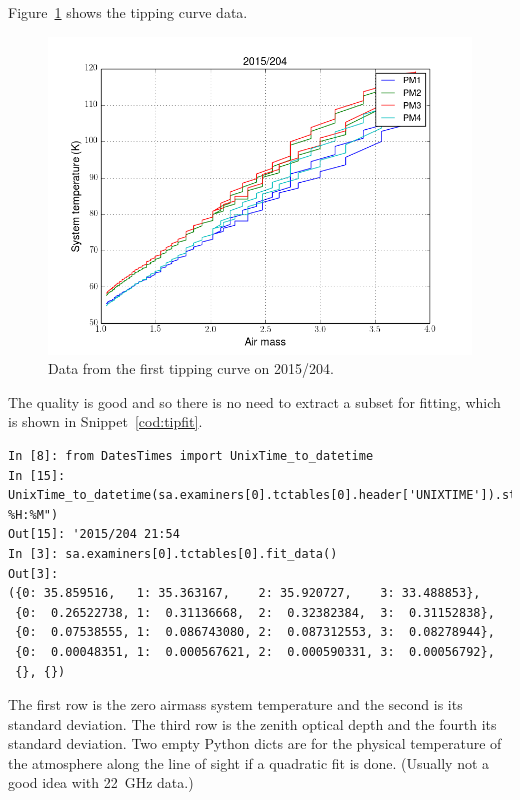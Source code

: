 \documentclass[letterpaper,11pt]{book}
\begin{document}
Figure~\ref{fig:tc-plot} shows the tipping curve data.
\begin{figure}[h!tb]
\begin{center}
\includegraphics[width=5in]{tipping43-204-2.png}
\caption{\label{fig:tc-plot}Data from the first tipping curve on 2015/204.}
\end{center}
\end{figure}
The quality is good and so there is no need to extract a subset for fitting,
which is shown in Snippet~\ref{cod:tipfit}.
\begin{code}[h!tb]
\begin{center}
{\scriptsize \begin{verbatim}
In [8]: from DatesTimes import UnixTime_to_datetime
In [15]: UnixTime_to_datetime(sa.examiners[0].tctables[0].header['UNIXTIME']).strftime("%Y/%j %H:%M")
Out[15]: '2015/204 21:54
In [3]: sa.examiners[0].tctables[0].fit_data()
Out[3]: 
({0: 35.859516,   1: 35.363167,    2: 35.920727,    3: 33.488853},
 {0:  0.26522738, 1:  0.31136668,  2:  0.32382384,  3:  0.31152838},
 {0:  0.07538555, 1:  0.086743080, 2:  0.087312553, 3:  0.08278944},
 {0:  0.00048351, 1:  0.000567621, 2:  0.000590331, 3:  0.00056792},
 {}, {})\end{verbatim}
}\caption[Fit temperature {\itshape vs} airmass]{\label{cod:tipfit}Fitting 
TIPPING CURVE data to a straight line of system temperature {\itshape vs} 
airmass.}
\end{center}
\end{code}
The first row is the zero airmass system temperature and the second is its
standard deviation. The third row is the zenith optical depth and the fourth its
standard deviation. Two empty Python {\ttfamily dict}s are for the physical
temperature of the atmosphere along the line of sight if a quadratic fit is
done. (Usually not a good idea with 22~GHz data.)
\end{document}
